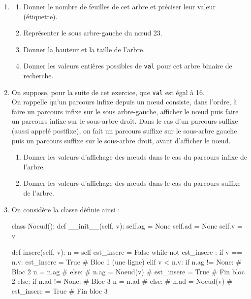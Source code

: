 \documentclass[a4paper,12pt,french]{book}
\begin{document}
\begin{enumerate}[\bfseries 1.]
	\item \begin{enumerate}[\bfseries a.]
    	\item Donner le nombre de feuilles de cet arbre et préciser leur valeur (étiquette).
        \item Représenter le sous arbre-gauche du nœud 23.
        \item Donner la hauteur et la taille de l’arbre.
        \item Donner les valeurs entières possibles de \texttt{val} pour cet arbre binaire de recherche.
    \end{enumerate}


    \item On suppose, pour la suite de cet exercice, que \texttt{val} est égal à 16.\\

        On rappelle qu’un parcours infixe depuis un nœud consiste, dans l’ordre, à faire un parcours infixe sur le sous arbre-gauche, afficher le nœud puis faire un parcours infixe sur le sous-arbre droit.
        Dans le cas d’un parcours suffixe (aussi appelé postfixe), on fait un parcours suffixe sur le sous-arbre gauche puis un parcours suffixe sur le sous-arbre droit, avant d’afficher le nœud.\\

            \begin{enumerate}[\bfseries a.]
            	\item Donner les valeurs d’affichage des nœuds dans le cas du parcours infixe de l’arbre.
                \item Donner les valeurs d’affichage des nœuds dans le cas du parcours suffixe de l’arbre.
            \end{enumerate}
\newpage
      \item On considère la classe  définie ainsi :

\begin{pythoncode}
class Noeud():
    def __init__(self, v):
        self.ag = None
        self.ad = None
        self.v = v

    def insere(self, v):
        n = self
        est_insere = False
        while not est_insere :
            if v == n.v:
                est_insere = True       # Bloc 1 (une ligne)
            elif v < n.v:
                if n.ag != None:        # Bloc 2
                    n = n.ag            #
                else:                   #
                    n.ag = Noeud(v)     #
                    est_insere = True   # Fin bloc 2
            else:
                if n.ad != None:        # Bloc 3
                    n = n.ad            #
                else:                   #
                    n.ad = Noeud(v)     #
                    est_insere = True   # Fin bloc 3


\end{pythoncode}
\end{enumerate}
\end{document}
